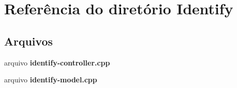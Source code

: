 \section{Referência do diretório Identify}
\label{dir_16bfbb3e58031681d88f71d7d3904d7a}
\subsection*{Arquivos}
\begin{DoxyCompactItemize}
\item 
arquivo {\bf identify-\/controller.\+cpp}
\item 
arquivo {\bf identify-\/model.\+cpp}
\end{DoxyCompactItemize}
